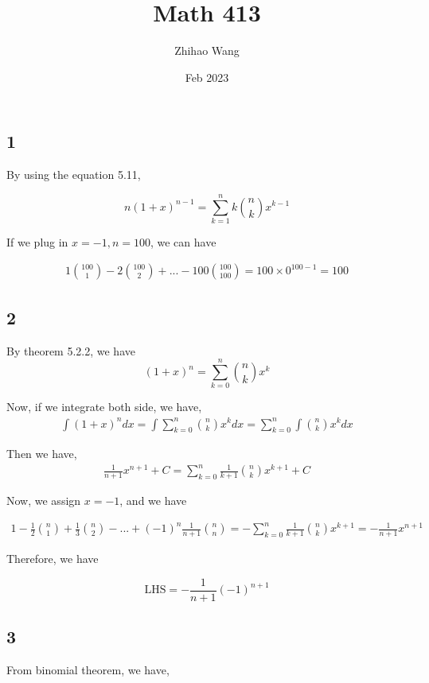 \documentclass{article}
\title{Math 413}
\author{Zhihao Wang}
\date{Feb 2023}
\begin{document}
\maketitle

\subsection*{1}

By using the equation 5.11,

$$n(1+x)^{n-1} = \sum \limits_{k=1}^{n} k {n \choose k} x^{k-1}$$

If we plug in $x = -1, n = 100$, we can have

\[
\begin{split}
1{100 \choose 1} - 2{100 \choose 2} + ... - 100{100 \choose 100} = 100 \times 0^{100 - 1} = 100
\end{split}
\]

\subsection*{2}

By theorem 5.2.2, we have
$$(1+x)^{n} = \sum \limits_{k=0}^{n} {n \choose k} x^{k}$$

Now, if we integrate both side, we have,
\[
\begin{split}
\int (1+x)^{n} dx = \int \sum \limits_{k=0}^{n} {n \choose k} x^{k} dx =  \sum \limits_{k=0}^{n} \int {n \choose k} x^{k} dx
\end{split}
\]

Then we have,
\[
\begin{split}
\frac{1}{n+1} x^{n+1} + C = \sum \limits_{k=0}^{n} \frac{1}{k+1} {n \choose k} x^{k+1} + C
\end{split}
\]

Now, we assign $x = -1$, and we have

\[
\begin{split}
1 -\frac{1}{2}{n \choose 1} + \frac{1}{3}{n \choose 2} - ... + (-1)^n\frac{1}{n+1}{n \choose n} = -\sum \limits_{k=0}^{n} \frac{1}{k+1} {n \choose k} x^{k+1} = - \frac{1}{n+1}x^{n+1}
\end{split}
\]

Therefore, we have

$$\text{LHS} = - \frac{1}{n+1}{(-1)}^{n+1} $$

\subsection*{3}
From binomial theorem, we have,
\end{document}
